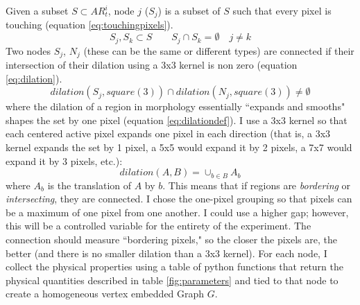 \documentclass[defaultstyle,11pt]{thesis}
\begin{document}
Given a subset $S \subset AR_t^i$, node $j$ ($S_j$) is a subset of $S$ such that every pixel is touching (equation \ref{eq:touchingpixels}).
\begin{equation}
    S_j, S_k \subset S \qquad S_j \cap S_k = \emptyset \quad j \neq k
    \label{eq:touchingpixels}
\end{equation}
Two nodes $S_j$, $N_j$ (these can be the same or different types) are connected if their intersection of their dilation using a 3x3 kernel is non zero (equation \ref{eq:dilation}).
\begin{equation}
    dilation(S_j, square(3)) \cap dilation(N_j, square(3)) \neq \emptyset
    \label{eq:dilation}
\end{equation}
where the dilation of a region in morphology essentially ``expands and smooths" shapes the set by one pixel (equation \ref{eq:dilationdef}). I use a 3x3 kernel so that each centered active pixel expands one pixel in each direction (that is, a 3x3 kernel expands the set by 1 pixel, a 5x5 would expand it by 2 pixels, a 7x7 would expand it by 3 pixels, etc.):
\begin{equation}
    dilation(A, B) = \cup_{b\in B}A_b
    \label{eq:dilationdef}
\end{equation}
where $A_b$ is the translation of $A$ by $b$. This means that if regions are \textit{bordering} or \textit{intersecting}, they are connected. I chose the one-pixel grouping so that pixels can be a maximum of one pixel from one another. I could use a higher gap; however, this will be a controlled variable for the entirety of the experiment. The connection should measure ``bordering pixels," so the closer the pixels are, the better (and there is no smaller dilation than a 3x3 kernel). For each node, I collect the physical properties using a table of python functions that return the physical quantities described in table \ref{fig:parameters} and tied to that node to create a homogeneous vertex embedded Graph $G$.
\end{document}
